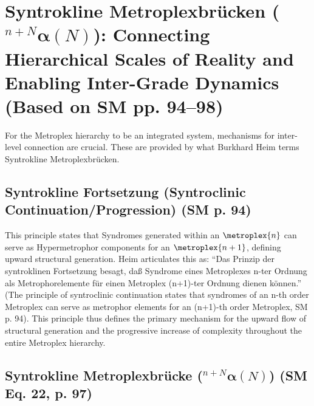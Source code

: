 \documentclass[
    12pt,              %
    a4paper,           %
    headings=normal,   %
    twoside=true,      %
    BCOR=8mm,          %
]{scrbook}
\newcommand{\q}[1]{\enquote{#1}}
\newcommand{\syntroklinebruecke}[1]{{}^{#1}\bm{\alpha}}
\begin{document}
\section{\texorpdfstring{Syntrokline Metroplexbrücken (\(\syntroklinebruecke{n+N}(N)\)): Connecting Hierarchical Scales of Reality and Enabling Inter-Grade Dynamics (Based on SM pp. 94–98)}{Syntrokline Metroplexbrücken (alpha-bridge(n+N)(N)): Connecting Hierarchical Scales of Reality and Enabling Inter-Grade Dynamics (Based on SM pp. 94-98)}}
\label{sec:ch5_syntrokline_bridges} %

For the Metroplex hierarchy to be an integrated system, mechanisms for inter-level connection are crucial. These are provided by what Burkhard Heim terms Syntrokline Metroplexbrücken.
\subsection{Syntrokline Fortsetzung (Syntroclinic Continuation/Progression) (SM p. 94)}
\label{sec:ch5_syntrokline_fortsetzung} %

This principle states that Syndromes generated within an \(\metroplex{n}\) can serve as Hypermetrophor components for an \(\metroplex{n+1}\), defining upward structural generation. Heim articulates this as: \q{Das Prinzip der syntroklinen Fortsetzung besagt, daß Syndrome eines Metroplexes n-ter Ordnung als Metrophorelemente für einen Metroplex (n+1)-ter Ordnung dienen können.} (The principle of syntroclinic continuation states that syndromes of an n-th order Metroplex can serve as metrophor elements for an (n+1)-th order Metroplex, SM p. 94). This principle thus defines the primary mechanism for the upward flow of structural generation and the progressive increase of complexity throughout the entire Metroplex hierarchy.
\subsection{\texorpdfstring{Syntrokline Metroplexbrücke (\(\syntroklinebruecke{n+N}(N)\)) (SM Eq. 22, p. 97)}{Syntrokline Metroplexbrücke (alpha-bridge(n+N)(N)) (SM Eq. 22, p. 97)}}
\label{sec:ch5_bridge_formal_def} %
\end{document}
